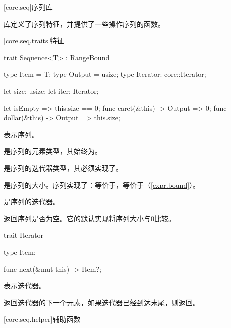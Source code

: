 
[core.seq]{序列库}

\pnum
{}库定义了序列特征，并提供了一些操作序列的函数。

[core.seq.traits]{特征}

\begin{itemdecl}
trait Sequence<T> : RangeBound {
    type Item = T;
    type Output = usize;
    type Iterator: core::Iterator;

    let size: usize;
    let iter: Iterator;

    let isEmpty => this.size == 0;
    func caret(&this) -> Output => 0;
    func dollar(&this) -> Output => this.size;
}
\end{itemdecl}

\pnum
{}表示序列。

\pnum
{}是序列的元素类型，其始终为。

\pnum
{}是序列的迭代器类型，其必须实现了。

\pnum
{}是序列的大小。序列实现了：\tcode{\textasciicircum}等价于，\tcode{\$}等价于（\ref{expr.bound}）。

\pnum
{}是序列的迭代器。

\pnum
{}返回序列是否为空。它的默认实现将序列大小与0比较。

\begin{itemdecl}
trait Iterator {
    type Item;

    func next(&mut this) -> Item?;
}
\end{itemdecl}

\pnum
{}表示迭代器。

\pnum
{}返回迭代器的下一个元素，如果迭代器已经到达末尾，则返回。

[core.seq.helper]{辅助函数}

